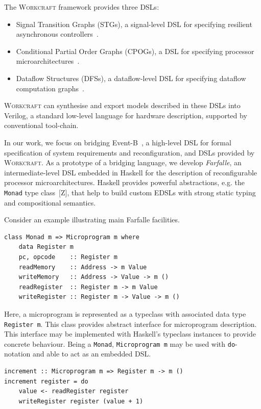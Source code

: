 \documentclass[conference]{IEEEtran}
\begin{document}
The \textsc{Workcraft} framework provides three DSLs:

\begin{itemize}
\item Signal Transition Graphs (STGs), a signal-level DSL for
specifying resilient asynchronous controllers~\cite{STG}.
\item Conditional Partial Order Graphs (CPOGs), a DSL for specifying
processor microarchitectures~\cite{ISA-formal}.
\item Dataflow Structures (DFSs), a dataflow-level DSL
for specifying dataflow computation graphs~\cite{DFS}.
\end{itemize}

\textsc{Workcraft} can synthesise and export models described in these DSLs into
Verilog, a standard low-level language for hardware description, supported
by conventional tool-chain.

In our work, we focus on bridging Event-B~\cite{EventB}, a high-level DSL
for formal specification of system requirements and reconfiguration,
and DSLs provided by \textsc{Workcraft}. As a prototype of a bridging language,
we develop \emph{Farfalle}, an intermediate-level DSL embedded in Haskell for
the description of reconfigurable processor microarchitectures.
Haskell provides powerful abstractions, e.g. the \texttt{Monad} type class~[Z],
that help to build custom EDSLs with strong static typing and compositional
semantics.

Consider an example illustrating main Farfalle facilities.

\begin{verbatim}
class Monad m => Microprogram m where
    data Register m
    pc, opcode    :: Register m
    readMemory    :: Address -> m Value
    writeMemory   :: Address -> Value -> m ()
    readRegister  :: Register m -> m Value
    writeRegister :: Register m -> Value -> m ()
\end{verbatim}

Here, a microprogram is represented as a typeclass with associated
data type \texttt{Register m}. This class provides abstract interface for
microprogram description. This interface may be
implemented with Haskell's typeclass instances to provide concrete behaviour.
Being a \texttt{Monad}, \texttt{Microprogram m} may be used with
\texttt{do}-notation and able to act as an embedded DSL.

\begin{verbatim}
increment :: Microprogram m => Register m -> m ()
increment register = do
    value <- readRegister register
    writeRegister register (value + 1)
\end{verbatim}
\end{document}
